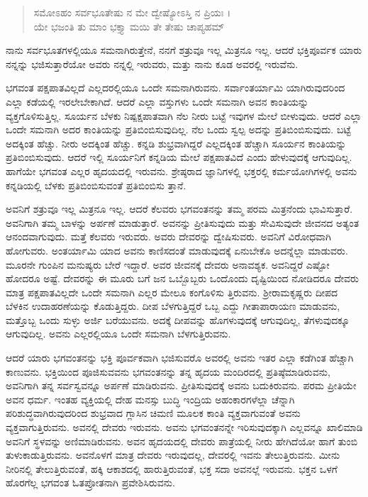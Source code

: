 \begin{verse}
ಸಮೋಽಹಂ ಸರ್ವಭೂತೇಷು ನ ಮೇ ದ್ವೇಷ್ಯೋಽಸ್ತಿ ನ ಪ್ರಿಯಃ ।\\ಯೇ ಭಜಂತಿ ತು ಮಾಂ ಭಕ್ತ್ಯಾ ಮಯಿ ತೇ ತೇಷು ಚಾಪ್ಯಹಮ್ 
\end{verse}

{\small ನಾನು ಸರ್ವಭೂತಗಳಲ್ಲಿಯೂ ಸಮನಾಗಿರುತ್ತೇನೆ, ನನಗೆ ಶತ್ರುವೂ ಇಲ್ಲ ಮಿತ್ರನೂ ಇಲ್ಲ. ಆದರೆ ಭಕ್ತಿಪೂರ್ವಕ ಯಾರು ನನ್ನನ್ನು ಭಜಿಸುತ್ತಾರೆಯೋ ಅವರು ನನ್ನಲ್ಲಿ ಇರುವರು, ಮತ್ತು ನಾನು ಕೂಡ ಅವರಲ್ಲಿ ಇರುವೆನು.}

ಭಗವಂತ ಪಕ್ಷಪಾತವಿಲ್ಲದೆ ಎಲ್ಲದರಲ್ಲಿಯೂ ಒಂದೇ ಸಮನಾಗಿರುವನು. ಸರ್ವಾಂತರ್ಯಾಮಿ ಯಾಗಿರುವುದರಿಂದ ಎಲ್ಲಾ ಕಡೆಯಲ್ಲಿ ಇರಲೇಬೇಕಾಗಿದೆ. ಆದರೆ ಎಲ್ಲಾ ವಸ್ತುಗಳು ಒಂದೇ ಸಮನಾಗಿ ಅವನ ಕಾಂತಿಯನ್ನು ವ್ಯಕ್ತಗೊಳಿಸುತ್ತಿಲ್ಲ. ಸೂರ್ಯನ ಬೆಳಕು ನಿಷ್ಪಕ್ಷಪಾತವಾಗಿ ನೆಲ ನೀರು ಬಟ್ಟೆ ಇವುಗಳ ಮೇಲೆ ಬೀಳುವುದು. ಆದರೆ ಎಲ್ಲಾ ಒಂದೇ ಸಮನಾಗಿ ಅದರ ಕಾಂತಿಯನ್ನು ಪ್ರತಿಬಿಂಬಿಸುವುದಿಲ್ಲ. ನೆಲ ಒಂದು ಸ್ವಲ್ಪ ಅದನ್ನು ಪ್ರತಿಬಿಂಬಿಸುವುದು. ಬಟ್ಟೆ ಅದಕ್ಕಿಂತ ಹೆಚ್ಚು. ನೀರು ಅದಕ್ಕಿಂತ ಹೆಚ್ಚು. ಕನ್ನಡಿ ಶುಭ್ರವಾಗಿದ್ದರೆ ಎಲ್ಲದಕ್ಕಿಂತ ಹೆಚ್ಚಾಗಿ ಸೂರ್ಯನ ಕಾಂತಿಯನ್ನು ಪ್ರತಿಬಿಂಬಿಸುವುದು. ಆದರೆ ಇಲ್ಲಿ ಸೂರ್ಯನಿಗೆ ಕನ್ನಡಿಯ ಮೇಲೆ ಪಕ್ಷಪಾತವಿದೆ ಎಂದು ಹೇಳುವುದಕ್ಕೆ ಆಗುವುದಿಲ್ಲ. ಹಾಗೆಯೇ ಭಗವಂತ ಎಲ್ಲರ ಹೃದಯದಲ್ಲಿ ಇರುವನು. ಶ್ರೇಷ್ಠರಾದ ಜ್ಞಾನಿಗಳಲ್ಲಿ ಭಕ್ತರಲ್ಲಿ ಕರ್ಮಯೋಗಿಗಳಲ್ಲಿ ಅವನು ಕನ್ನಡಿಯಲ್ಲಿ ಬೆಳಕು ಪ್ರತಿಬಿಂಬಿಸುವಂತೆ ಪ್ರತಿಬಿಂಬಿಸು ತ್ತಾನೆ.

ಅವನಿಗೆ ಶತ್ರುವೂ ಇಲ್ಲ ಮಿತ್ರನೂ ಇಲ್ಲ. ಆದರೆ ಕೆಲವರು ಭಗವಂತನನ್ನು ತಮ್ಮ ಪರಮ ಮಿತ್ರನೆಂದು ಭಾವಿಸುತ್ತಾರೆ. ಅವನಿಗಾಗಿ ತಮ್ಮ ಬಾಳನ್ನು ಅರ್ಪಣೆ ಮಾಡುತ್ತಾರೆ. ಅವನನ್ನು ಪ್ರೀತಿಸುವುದು ಮತ್ತು ಸೇವಿಸುವುದೇ ಜೀವನದ ಅತ್ಯಂತ ಆನಂದವಾಗುವುದು. ಮತ್ತೆ ಕೆಲವರು ಇರುವರು. ಅವರು ದೇವರನ್ನು ದ್ವೇಷಿಸುವರು. ಅವನಿಗೆ ವಿರೋಧವಾಗಿ ಹೋಗುವರು. ಅಂತರ್ಯಾಮಿ ಯಾದ ಅವನು ಕಾಣಿಸದಂತೆ ಮಾಡುವುದಕ್ಕೆ ಏನುಬೇಕೊ ಅದನ್ನೆಲ್ಲಾ ಮಾಡುವರು. ಮೂರನೇ ಗುಂಪಿನ ಮನುಷ್ಯರು ಬೇರೆ ಇದ್ದಾರೆ. ಅವರ ಜೀವನಕ್ಕೆ ದೇವರು ಅನಾವಶ್ಯಕ. ಅವನಿದ್ದರೆ ಎಷ್ಟೋ ಹೋದರೂ ಅಷ್ಟೆ. ದೇವರನ್ನು ಈ ಮೂರು ಬಗೆ ಜನ ಒಬ್ಬೊಬ್ಬರು ಒಂದೊಂದು ದೃಷ್ಟಿಯಿಂದ ನೋಡಿದರೂ ದೇವರು ಮಾತ್ರ ಪಕ್ಷಪಾತವಿಲ್ಲದೇ ಒಂದೇ ಸಮನಾಗಿ ಎಲ್ಲರ ಮೇಲೂ ಕಂಗೊಳಿಸು ತ್ತಿರುವನು. ಶ್ರೀರಾಮಕೃಷ್ಣರು ದೀಪದ ಬೆಳಕಿನ ಉದಾಹರಣೆಯನ್ನು ಕೊಡುತ್ತಿದ್ದರು. ದೀಪ ಬೆಳಗುತ್ತಿದ್ದರೆ ಒಬ್ಬ ಎದ್ದು ಗೀತಾಪಾರಾಯಣ ಮಾಡುವನು, ಮತ್ತೊಬ್ಬ ಒಂದು ಸುಳ್ಳು ಅರ್ಜಿ ಬರೆಯುವನು. ಅದಕ್ಕೆ ದೀಪವನ್ನು ಹೊಗಳುವುದಕ್ಕೆ ಆಗುವುದಿಲ್ಲ, ತೆಗಳುವುದಕ್ಕೂ ಆಗುವುದಿಲ್ಲ. ಅವನು ಎಲ್ಲರಲ್ಲಿಯೂ ಒಂದೇ ಸಮನಾಗಿ ಬೆಳಗುತ್ತಿರುವನು.

ಆದರೆ ಯಾರು ಭಗವಂತನನ್ನು ಭಕ್ತಿ ಪೂರ್ವಕವಾಗಿ ಭಜಿಸುವರೊ ಅವರಲ್ಲಿ ಅವನು ಇತರ ಎಲ್ಲಾ ಕಡೆಗಿಂತ ಹೆಚ್ಚಾಗಿ ಕಾಣುವನು. ಭಕ್ತಿಯಿಂದ ಪೂಜಿಸುವವನು ಭಗವಂತನನ್ನು ತನ್ನ ಹೃದಯ ಮಂದಿರದಲ್ಲಿ ಪ್ರತಿಷ್ಠೆಮಾಡಿರುವನು, ಅವನಿಗಾಗಿ ತನ್ನ ಸರ್ವಸ್ವವನ್ನೂ ಅರ್ಪಣೆ ಮಾಡಿರುವನು. ಪ್ರೀತಿಸುವುದಕ್ಕೆ ಅವನು ಬದುಕಿರುವನು. ಪರಮ ಪ್ರೀತಿಯೇ ಅವನ ಧರ್ಮ. ಇಂತಹ ವ್ಯಕ್ತಿಯಲ್ಲಿ ದೇಹ ಮನಸ್ಸು ಬುದ್ಧಿ ಇಂದ್ರಿಯ ಅಹಂಕಾರಗಳೆಲ್ಲಾ ಚೆನ್ನಾಗಿ ಪರಿಶುದ್ಧವಾಗಿರುವುದರಿಂದ ಶುಭ್ರವಾದ ಗ್ಲಾಸಿನ ಚಿಮಣಿ ಮೂಲಕ ಕಾಂತಿ ವ್ಯಕ್ತವಾಗುವಂತೆ ಅವನು ವ್ಯಕ್ತವಾಗುತ್ತಿರುವನು. ಅವನಲ್ಲಿ ದೇವರು ಇರುವನು. ಅವನು ಭಗವಂತನನ್ನೇ ಇರಿಸುವುದಕ್ಕಾಗಿ ಎಲ್ಲವನ್ನೂ ಖಾಲಿಮಾಡಿ ಅವನಿಗೆ ಸ್ಥಳವನ್ನು ಅಣಿಮಾಡಿರುವನು. ಅವನ ಹೃದಯದಲ್ಲಿ ದೇವರು ಪಾತ್ರೆಯಲ್ಲಿ ನೀರು ಹೇಗಿದೆಯೋ ಹಾಗೆ ತುಂಬಿ ತುಳುಕಾಡುತ್ತಿರುವನು. ಅವನೊಳಗೆ ಮಾತ್ರ ದೇವರು ಇರುವುದಲ್ಲ, ದೇವರಲ್ಲಿ ಇವನು ತೇಲುತ್ತಿರುವನು. ಮೀನು ನೀರಿನಲ್ಲಿ ತೇಲುತ್ತಿರುವಂತೆ, ಹಕ್ಕಿ ಆಕಾಶದಲ್ಲಿ ಹಾರುತ್ತಿರುವಂತೆ, ಭಕ್ತ ಸದಾ ಅವನಲ್ಲೆ ಇರುವನು. ಭಕ್ತನ ಒಳಗೆ ಹೊರಗೆಲ್ಲ ಭಗವಂತ ಓತಪ್ರೋತನಾಗಿ ಪ್ರವೇಶಿಸಿರುವನು.

